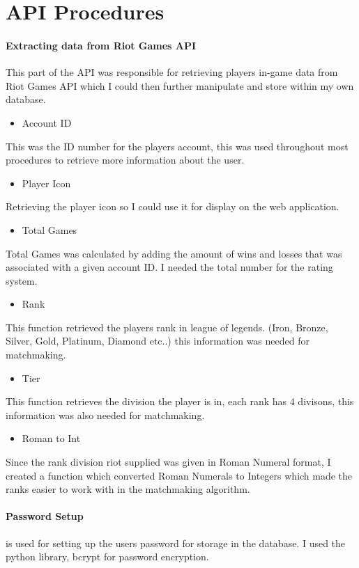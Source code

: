 \newpage
\section{API Procedures}

\paragraph{Extracting data from Riot Games API}
This part of the API was responsible for retrieving players in-game data from Riot Games API which I could then further manipulate and store within my own database.
\begin{itemize}
	\item Account ID
\end{itemize}
This was the ID number for the players account, this was used throughout most procedures to retrieve more information about the user.
\begin{itemize}
	\item Player Icon
\end{itemize}
Retrieving the player icon so I could use it for display on the web application.
\begin{itemize}
	\item Total Games
\end{itemize}
Total Games was calculated by adding the amount of wins and losses that was associated with a given account ID. I needed the total number for the rating system.
\begin{itemize}
	\item Rank
\end{itemize}
This function retrieved the players rank in league of legends.
(Iron, Bronze, Silver, Gold, Platinum, Diamond etc..) this information was needed for matchmaking.
\begin{itemize}
	\item Tier
\end{itemize}
This function retrieves the division the player is in, each rank has 4 divisons, this information was also needed for matchmaking.
\begin{itemize}
	\item Roman to Int
\end{itemize}
Since the rank division riot supplied was given in Roman Numeral format, I created a function which converted Roman Numerals to Integers which made the ranks easier to work with in the matchmaking algorithm.

\newpage
\paragraph{Password Setup} is used for setting up the users password for storage in the database. I used the python library, bcrypt for password encryption.


